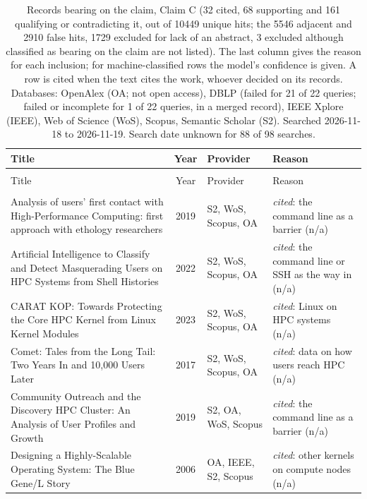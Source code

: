 \begin{longtable}{@{}%
  >{\raggedright\arraybackslash}p{}c%
  >{\raggedright\arraybackslash}p{}%
  >{\raggedright\arraybackslash}p{}@{}}
\caption{Records bearing on the claim, Claim C (32 cited, 68 supporting and 161 qualifying or contradicting it, out of 10449 unique hits; the 5546 adjacent and 2910 false hits, 1729 excluded for lack of an abstract, 3 excluded although classified as bearing on the claim are not listed). The last column gives the reason for each inclusion; for machine-classified rows the model's confidence is given. A row is cited when the text cites the work, whoever decided on its records. Databases: OpenAlex (OA; not open access), DBLP (failed for 21 of 22 queries; failed or incomplete for 1 of 22 queries, in a merged record), IEEE Xplore (IEEE), Web of Science (WoS), Scopus, Semantic Scholar (S2). Searched 2026-11-18 to 2026-11-19. Search date unknown for 88 of 98 searches.}\label{tab:sok-hpc-cli}\\
\toprule
Title & Year & Provider & Reason \\
\midrule
\endfirsthead
\multicolumn{4}{@{}l}{\emph{\tablename~\thetable{} (cont.)}}\\
\toprule
Title & Year & Provider & Reason \\
\midrule
\endhead
\midrule \multicolumn{4}{r@{}}{\emph{continued on next page}}\\
\endfoot
\bottomrule
\endlastfoot
Analysis of users' first contact with High-Performance Computing: first approach with ethology researchers & 2019 & S2, WoS, Scopus, OA & \emph{cited}: the command line as a barrier (n/a) \\
Artificial Intelligence to Classify and Detect Masquerading Users on HPC Systems from Shell Histories & 2022 & S2, WoS, Scopus, OA & \emph{cited}: the command line or SSH as the way in (n/a) \\
CARAT KOP: Towards Protecting the Core HPC Kernel from Linux Kernel Modules & 2023 & S2, WoS, Scopus, OA & \emph{cited}: Linux on HPC systems (n/a) \\
Comet: Tales from the Long Tail: Two Years In and 10,000 Users Later & 2017 & S2, WoS, Scopus, OA & \emph{cited}: data on how users reach HPC (n/a) \\
Community Outreach and the Discovery HPC Cluster: An Analysis of User Profiles and Growth & 2019 & S2, OA, WoS, Scopus & \emph{cited}: the command line as a barrier (n/a) \\
Designing a Highly-Scalable Operating System: The Blue Gene/L Story & 2006 & OA, IEEE, S2, Scopus & \emph{cited}: other kernels on compute nodes (n/a) \\

\end{longtable}

